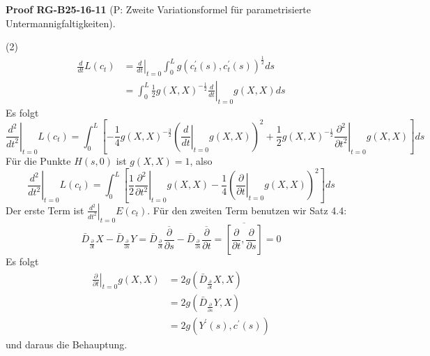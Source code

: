 \documentclass[10pt, letterpaper]{article}
\newcommand{\CustomHeading}[3]{%
  \par\medskip\noindent%
  \textbf{#1 #2} \textnormal{(#3)}.\enskip%
}
\newenvironment{PROOF}[2]{\begin{unitbox}\CustomHeading{Proof}{#1}{#2}}{\end{unitbox}}
\begin{document}
\begin{PROOF}{RG-B25-16-11}{P: Zweite Variationsformel für parametrisierte Untermannigfaltigkeiten}
(2)
$$
\begin{aligned}
\frac{d}{d t} L\left(c_{t}\right) & =\left.\frac{d}{d t}\right|_{t=0} \int_{0}^{L} g\left(c_{t}^{\prime}(s), c_{t}^{\prime}(s)\right)^{\frac{1}{2}} d s \\
& =\left.\int_{0}^{L} \frac{1}{2} g(X, X)^{-\frac{1}{2}} \frac{d}{d t}\right|_{t=0} g(X, X) d s
\end{aligned}
$$
Es folgt
$$
\left.\frac{d^{2}}{d t^{2}}\right|_{t=0} L\left(c_{t}\right)=\int_{0}^{L}\left[-\frac{1}{4} g(X, X)^{-\frac{3}{2}}\left(\left.\frac{d}{d t}\right|_{t=0} g(X, X)\right)^{2}+\left.\frac{1}{2} g(X, X)^{-\frac{1}{2}} \frac{\partial^{2}}{\partial t^{2}}\right|_{t=0} g(X, X)\right] d s
$$
Für die Punkte $H(s, 0)$ ist $g(X, X)=1$, also
$$
\left.\frac{d^{2}}{d t^{2}}\right|_{t=0} L\left(c_{t}\right)=\int_{0}^{L}\left[\left.\frac{1}{2} \frac{\partial^{2}}{\partial t^{2}}\right|_{t=0} g(X, X)-\frac{1}{4}\left(\left.\frac{\partial}{\partial t}\right|_{t=0} g(X, X)\right)^{2}\right] d s
$$
Der erste Term ist $\left.\frac{d^{2}}{d t^{2}}\right|_{t=0} E\left(c_{t}\right)$. Für den zweiten Term benutzen wir Satz 4.4:
$$
\bar{D}_{\frac{\partial}{\partial t}} X-\bar{D}_{\frac{\partial}{\partial s}} Y=\bar{D}_{\frac{\partial}{\partial t}} \overline{\frac{\partial}{\partial s}}-\bar{D}_{\frac{\partial}{\partial s}} \overline{\frac{\partial}{\partial t}}=\overline{\left[\frac{\partial}{\partial t}, \frac{\partial}{\partial s}\right]}=0
$$
Es folgt
$$
\begin{aligned}
\left.\frac{\partial}{\partial t}\right|_{t=0} g(X, X) & =2 g\left(\bar{D}_{\frac{\partial}{\partial t}} X, X\right) \\
& =2 g\left(\bar{D}_{\frac{\partial}{\partial s}} Y, X\right) \\
& =2 g\left(Y^{\prime}(s), c^{\prime}(s)\right)
\end{aligned}
$$
und daraus die Behauptung.



\end{PROOF}
\end{document}

